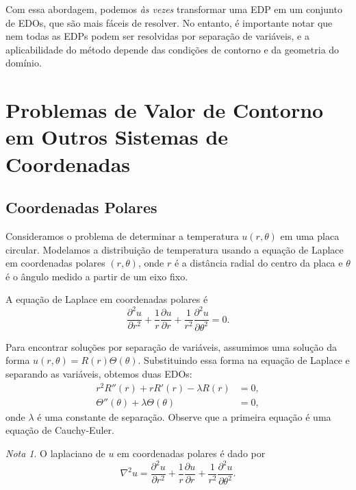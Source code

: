 \documentclass{article}
\theoremstyle{plain}
\theoremstyle{definition}
\theoremstyle{remark}
\newtheorem*{rem}{Nota}
\begin{document}
Com essa abordagem, podemos \emph{às vezes} transformar uma EDP em um conjunto de EDOs, que são mais fáceis de resolver. No entanto, é importante notar que nem todas as EDPs podem ser resolvidas por separação de variáveis, e a aplicabilidade do método depende das condições de contorno e da geometria do domínio.

\section{Problemas de Valor de Contorno em Outros Sistemas de Coordenadas}

\subsection{Coordenadas Polares}

Consideramos o problema de determinar a temperatura \(u(r, \theta)\) em uma placa circular. Modelamos a distribuição de temperatura usando a equação de Laplace em coordenadas polares \((r, \theta)\), onde \(r\) é a distância radial do centro da placa e \(\theta\) é o ângulo medido a partir de um eixo fixo.

A equação de Laplace em coordenadas polares é
    \begin{equation}
        \frac{\partial^2 u}{\partial r^2} + \frac{1}{r} \frac{\partial u}{\partial r} + \frac{1}{r^2} \frac{\partial^2 u}{\partial \theta^2} = 0.
    \end{equation}

Para encontrar soluções por separação de variáveis, assumimos uma solução da forma \(u(r,\theta) = R(r)\Theta(\theta)\). Substituindo essa forma na equação de Laplace e separando as variáveis, obtemos duas EDOs:
    \begin{align}
        r^2 R''(r) + r R'(r) - \lambda R(r) &= 0, \\
        \Theta''(\theta) + \lambda \Theta(\theta) &= 0,
    \end{align}
onde \(\lambda\) é uma constante de separação. Observe que a primeira equação é uma equação de Cauchy-Euler.

\begin{rem}
    O laplaciano de \(u\) em coordenadas polares é dado por
    \begin{equation}
        \nabla^2 u = \frac{\partial^2 u}{\partial r^2} + \frac{1}{r} \frac{\partial u}{\partial r} + \frac{1}{r^2} \frac{\partial^2 u}{\partial \theta^2}.
    \end{equation}
\end{rem}
\end{document}
